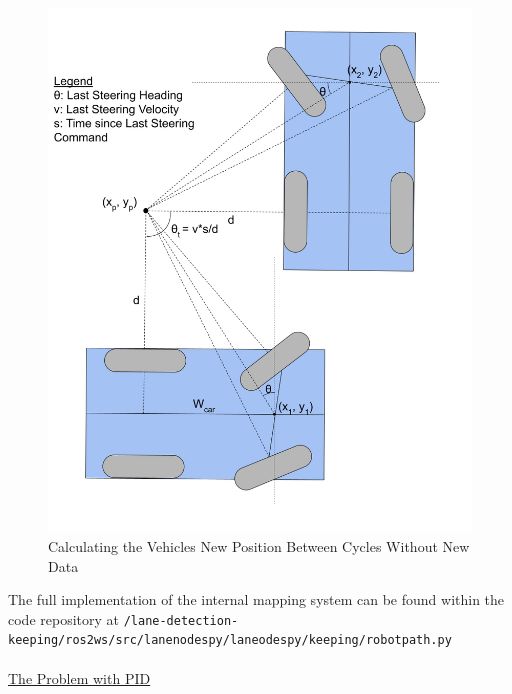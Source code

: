 \documentclass[titlepage]{article}
\begin{document}
{\begin{figure}
	\centering
	\includegraphics[width=5in]{update_description}
	\caption{Calculating the Vehicles New Position Between Cycles Without New Data}
	\label{fig:internal_update_determination}
\end{figure}

The full implementation of the internal mapping system can be found within the code repository at \texttt{/lane-detection-keeping/ros2\textunderscore ws/src/lane\textunderscore nodes\textunderscore py/lane\textunderscore odes\textunderscore py/keeping/robot\textunderscore path.py}\\~\\

\underline{The Problem with PID}

}
\end{document}
